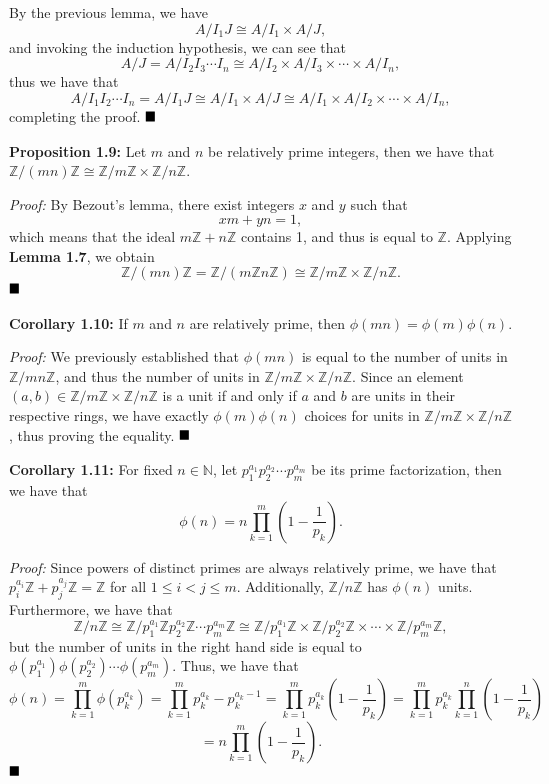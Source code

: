 \documentclass[12pt]{article}
\newcommand{\N}{\ensuremath{\mathbb{N}}}
\newcommand{\Z}{\ensuremath{\mathbb{Z}}}
\newcommand{\parenb}[1]{\left(#1\right)}
\newcommand{\proof}{\textit{Proof: }}
\newcommand{\done}{\ensuremath{\strut\hfill\blacksquare}}
\begin{document}
By the previous lemma, we have
\[
	A/I_1J \cong A/I_1 \times A/J,
\]
and invoking the induction hypothesis, we can see that
\[
	A/J
	= A/I_2I_3 \cdots I_n
	\cong A/I_2 \times A/I_3 \times \cdots \times A/I_n,
\]
thus we have that
\[
	A/I_1I_2 \cdots I_n
	= A/I_1J
	\cong A/I_1 \times A/J
	\cong A/I_1 \times A/I_2 \times \cdots \times A/I_n,
\]
completing the proof.
\done

\textbf{Proposition 1.9:}
Let \( m \) and \( n \) be relatively prime integers, then we have that
\( \Z/(mn)\Z \cong \Z/m\Z \times \Z/n\Z \).

\proof
By Bezout's lemma, there exist integers \( x \) and \( y \) such that
\[
	xm + yn = 1,
\]
which means that the ideal \( m\Z + n\Z \) contains 1, and thus is equal
to \( \Z \).
Applying \textbf{Lemma 1.7}, we obtain
\[
	\Z/(mn)\Z
	= \Z/(m\Z n\Z)
	\cong \Z/m\Z \times \Z/n\Z.
\]
\done

\textbf{Corollary 1.10:}
If \( m \) and \( n \) are relatively prime, then
\( \phi(mn) = \phi(m)\phi(n) \).

\proof
We previously established that \( \phi(mn) \) is equal to the number of units
in \( \Z/mn\Z \), and thus the number of units in \( \Z/m\Z \times \Z/n\Z \).
Since an element \( (a,b) \in \Z/m\Z \times \Z/n\Z \) is a unit if and only if
\( a \) and \( b \) are units in their respective rings, we have exactly
\( \phi(m)\phi(n) \) choices for units in \( \Z/m\Z \times \Z/n\Z \), thus
proving the equality.
\done

\textbf{Corollary 1.11:}
For fixed \( n \in \N \), let \( p_1^{a_1}p_2^{a_2} \cdots p_m^{a_m} \) be its
prime factorization, then we have that
\[
	\phi(n) = n\prod_{k = 1}^m \parenb{1 - \frac{1}{p_k}}.
\]

\proof
Since powers of distinct primes are always relatively prime, we have that
\( p_i^{a_i}\Z + p_j^{a_j}\Z = \Z \) for all \( 1 \leq i < j \leq m \).
Additionally, \( \Z/n\Z \) has \( \phi(n) \) units.
Furthermore, we have that
\[
	\Z/n\Z
	\cong \Z/p_1^{a_1}\Z p_2^{a_2}\Z \cdots p_m^{a_m}\Z
	\cong \Z/p_1^{a_1}\Z
	\times \Z/p_2^{a_2}\Z
	\times \cdots \times \Z/p_m^{a_m}\Z,
\]
but the number of units in the right hand side is equal to
\( \phi(p_1^{a_1})\phi(p_2^{a_2}) \cdots \phi(p_m^{a_m}) \).
Thus, we have that
\[
	\phi(n)
	= \prod_{k = 1}^m \phi(p_k^{a_k})
	= \prod_{k = 1}^m p_k^{a_k} - p_k^{a_k - 1}
	= \prod_{k = 1}^m p_k^{a_k}\parenb{1 - \frac{1}{p_k}}
	= \prod_{k = 1}^m p_k^{a_k} \prod_{k = 1}^n \parenb{1 - \frac{1}{p_k}}
\]
\[
	= n\prod_{k = 1}^m \parenb{1 - \frac{1}{p_k}}.
\]
\done
\end{document}
